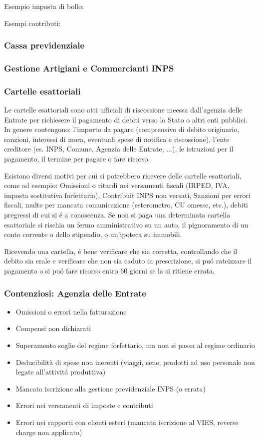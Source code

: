 \documentclass{article}
\begin{document}
Esempio imposta di bollo:

Esempi contributi:

\subsubsection{Cassa previdenziale}
\subsubsection{Gestione Artigiani e Commercianti INPS}

\subsubsection{Cartelle esattoriali}
Le cartelle esattoriali sono atti ufficiali di riscossione meessa dall'agenzia delle Entrate per richiesere il pagamento di debiti verso lo Stato o altri enti pubblici. In genere contengono: l'importo da pagare (comprensivo di debito originario, sanzioni, interessi di mora, eventuali spese di notifica e riscossione), l'ente creditore (es. INPS, Comune, Agenzia delle Entrate, ...), le istruzioni per il pagamento, il termine per pagare o fare ricorso. 

Esistono diversi motivi per cui si potrebbero ricevere delle cartelle esattoriali, come ad esempio: Omissioni o ritardi nei versamenti fiscali (IRPED, IVA, imposta sostitutiva forfettaria), Contribuit INPS non versati, Sanzioni per errori fiscali, multe per mancata comunicazione (esterometro, CU omesse, etc.), debiti pregressi di cui si \'e a conoscenza. Se non si paga una determinata cartella esattoriale si rischia un fermo amministrativo su un auto, il pignoramento di un conto corrente o dello stipendio, o un'ipoteca su immobili. 

Ricevendo una cartella, \'e bene verificare che sia corretta, controllando che il debito sia erale e verificare che non sia caduto in prescrizione, si pu\'o rateizzare il pagamento o si pu\'o fare ricorso entro 60 giorni se la si ritiene errata. 

\subsubsection{Contenziosi: Agenzia delle Entrate}
\begin{itemize}
    \item Omissioni o errori nella fatturazione
    \item Compensi non dichiarati
    \item Superamento soglie del regime forfettario, ma non si passa al regime ordinario
    \item Deducibilità di spese non inerenti (viaggi, cene, prodotti ad uso personale non legate all'attivit\'a produttiva)
    \item Mancata iscrizione alla gestione previdenziale INPS (o errata)
    \item Errori nei versamenti di imposte e contributi
    \item Errori nei rapporti con clienti esteri (mancata iscrizione al VIES, reverse charge non applicato)
\end{itemize}
\end{document}

